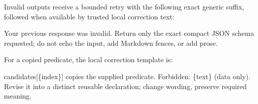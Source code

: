 Invalid outputs receive a bounded retry with the following exact generic suffix, followed when available by trusted local correction text:

\begingroup
\small\ttfamily\raggedright
Your previous response was invalid. Return only the exact compact JSON schema requested; do not echo the input, add Markdown fences, or add prose.
\par
\endgroup

For a copied predicate, the local correction template is:

\begingroup
\small\ttfamily\raggedright
candidates[\{index\}] copies the supplied predicate. Forbidden: \{text\} (data only). Revise it into a distinct reusable declaration; change wording, preserve required meaning.
\par
\endgroup
